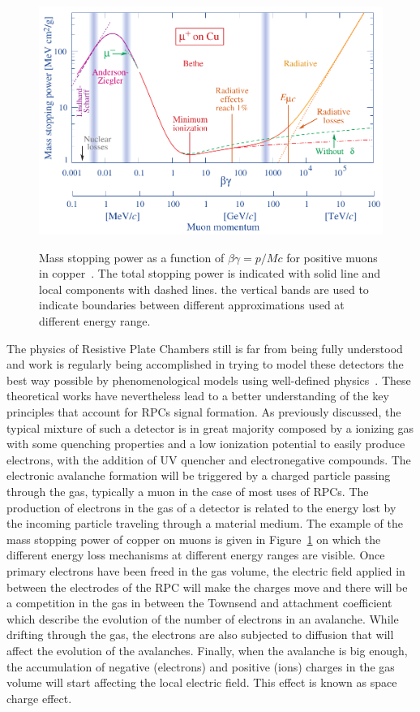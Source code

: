 	\begin{figure}[H]
		\centering
		\includegraphics[width = \plotwidth]{fig/chapt4/rpp_icru49_cu_col.pdf}\\
		\caption{\label{fig:enerlylosscopper} Mass stopping power as a function of $\beta\gamma = p/Mc$ for positive muons in copper~\cite{PDG2016}. The total stopping power is indicated with solid line and local components with dashed lines. the vertical bands are used to indicate boundaries between different approximations used at different energy range.}
	\end{figure}

	The physics of Resistive Plate Chambers still is far from being fully understood and work is regularly being accomplished in trying to model these detectors the best way possible by phenomenological models using well-defined physics~\cite{LIPPMANN2003,VINCENT2016,VINCENT2017}. These theoretical works have nevertheless lead to a better understanding of the key principles that account for RPCs signal formation. As previously discussed, the typical mixture of such a detector is in great majority composed by a ionizing gas with some quenching properties and a low ionization potential to easily produce electrons, with the addition of UV quencher and electronegative compounds. The electronic avalanche formation will be triggered by a charged particle passing through the gas, typically a muon in the case of most uses of RPCs. The production of electrons in the gas of a detector is related to the energy lost by the incoming particle traveling through a material medium. The example of the mass stopping power of copper on muons is given in Figure~\ref{fig:enerlylosscopper} on which the different energy loss mechanisms at different energy ranges are visible. Once primary electrons have been freed in the gas volume, the electric field applied in between the electrodes of the RPC will make the charges move and there will be a competition in the gas in between the Townsend and attachment coefficient which describe the evolution of the number of electrons in an avalanche. While drifting through the gas, the electrons are also subjected to diffusion that will affect the evolution of the avalanches. Finally, when the avalanche is big enough, the accumulation of negative (electrons) and positive (ions) charges in the gas volume will start affecting the local electric field. This effect is known as space charge effect.
	
